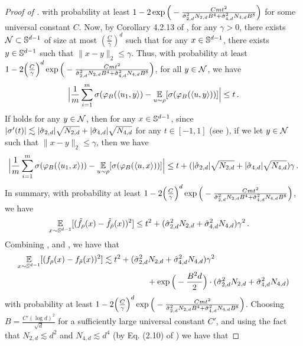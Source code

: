 \begin{proof} [Proof of ]
with probability at least $1 - 2 \exp\Big(-\frac{Cmt^2}{\hat{\sigma}_{2, d}^2 N_{2, d} B^4 + \hat{\sigma}_{4, d}^2 N_{4, d} B^8}\Big)$ for some universal constant $C$. Now, by Corollary 4.2.13 of \citet{vershynin2018high}, for any $\gamma > 0$, there exists $\mathcal{N} \subset \mathbb{S}^{d - 1}$ of size at most $(\frac{C}{\gamma})^d$ such that for any $x \in \mathbb{S}^{d - 1}$, there exists $y \in \mathbb{S}^{d - 1}$ such that $\|x - y\|_2 \leq \gamma$. Thus, with probability at least $1 - 2 \Big(\frac{C}{\gamma}\Big)^d \exp\Big(-\frac{Cmt^2}{\hat{\sigma}_{2, d}^2 N_{2, d} B^4 + \hat{\sigma}_{4, d}^2 N_{4, d} B^8}\Big)$, for all $y \in \mathcal{N}$, we have
\begin{align} \label{eq:finite_width_net_bound}
\Big| \frac{1}{m} \sum_{i = 1}^m \sigma({\varphi_B}(\langle u_1, y \rangle) - \operatorname*{\mathbb{E}}_{u \sim \rho} [\sigma({\varphi_B}(\langle u, y \rangle))] \Big| \leq t \,.
\end{align}
If  holds for any $y \in \mathcal{N}$, then for any $x \in \mathbb{S}^{d - 1}$, since $|\sigma'(t)| \lesssim |\hat{\sigma}_{2, d}| \sqrt{N_{2, d}} + |\hat{\sigma}_{4, d}| \sqrt{N_{4, d}}$ for any $t \in [-1, 1]$ (see ), if we let $y \in \mathcal{N}$ such that $\|x - y\|_2 \leq \gamma$, then we have
\begin{align}
\Big|\frac{1}{m} \sum_{i = 1}^m \sigma({\varphi_B}(\langle u_1, x \rangle)) - \operatorname*{\mathbb{E}}_{u \sim \rho}[\sigma({\varphi_B}(\langle u, x \rangle))] \Big| \leq t + (|\hat{\sigma}_{2, d}| \sqrt{N_{2, d}} + |\hat{\sigma}_{4, d}| \sqrt{N_{4, d}}) \gamma \,.
\end{align}
In summary, with probability at least $1 - 2 \Big(\frac{C}{\gamma}\Big)^d \exp\Big(-\frac{Cmt^2}{\hat{\sigma}_{2, d}^2 N_{2, d} B^4 + \hat{\sigma}_{4, d}^2 N_{4, d} B^8}\Big)$, we have
\begin{align} \label{eq:rho_vs_rhobar_tilde}
\operatorname*{\mathbb{E}}_{x \sim \mathbb{S}^{d - 1}} [(\tilde{f}_\rho(x) - \tilde{f}_{{\bar{\rho}}}(x))^2]
& \leq t^2 + (\hat{\sigma}_{2, d}^2 N_{2, d} + \hat{\sigma}_{4, d}^2 N_{4, d}) \gamma^2 \,.
\end{align}
Combining ,  and , we have that
\begin{align}
\operatorname*{\mathbb{E}}_{x \sim \mathbb{S}^{d - 1}} [(f_\rho(x) - f_{{\bar{\rho}}}(x))^2]
& \lesssim t^2 + (\hat{\sigma}_{2, d}^2 N_{2, d} + \hat{\sigma}_{4, d}^2 N_{4, d})\gamma^2 \\
& \,\,\,\,\,\,\,\,\,\,\,\,\,\,\,\,\,\,\,\,\,\,\,\,\,\,\,\,\,\,\,\, + \exp\Big(-\frac{B^2 d}{2} \Big) \cdot (\hat{\sigma}_{2, d}^2 N_{2, d} + \hat{\sigma}_{4, d}^2 N_{4, d})
\end{align}
with probability at least $1 - 2 \Big(\frac{C}{\gamma}\Big)^d \exp\Big(-\frac{Cmt^2}{\hat{\sigma}_{2, d}^2 N_{2, d} B^4 + \hat{\sigma}_{4, d}^2 N_{4, d} B^8}\Big)$. Choosing $B = \frac{C' (\log d)^2}{\sqrt{d}}$ for a sufficiently large universal constant $C'$, and using the fact that $N_{2, d} \lesssim d^2$ and $N_{4, d} \lesssim d^4$ (by Eq. (2.10) of \citet{atkinson2012spherical}) we have that

\end{proof}

